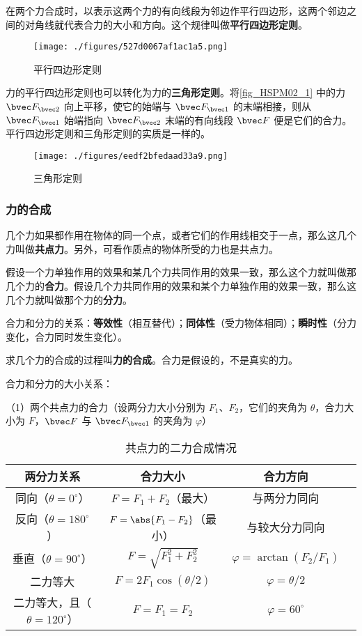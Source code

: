 在两个力合成时，以表示这两个力的有向线段为邻边作平行四边形，这两个邻边之间的对角线就代表合力的大小和方向。这个规律叫做\textbf{平行四边形定则}。
\begin{figure}[ht]
\centering
\texttt{[image: ./figures/527d0067af1ac1a5.png]}
\caption{平行四边形定则} \label{fig_HSPM02_1}
\end{figure}

力的平行四边形定则也可以转化为力的\textbf{三角形定则}。将\autoref{fig_HSPM02_1} 中的力 $\bvec F_{\bvec 2}$ 向上平移，使它的始端与 $\bvec F_{\bvec 1}$ 的末端相接，则从 $\bvec F_{\bvec 1}$ 始端指向 $\bvec F_{\bvec 2}$ 末端的有向线段 $\bvec F$ 便是它们的合力。平行四边形定则和三角形定则的实质是一样的。
\begin{figure}[ht]
\centering
\texttt{[image: ./figures/eedf2bfedaad33a9.png]}
\caption{三角形定则} \label{fig_HSPM02_2}
\end{figure}

\subsubsection{力的合成}
几个力如果都作用在物体的同一个点，或者它们的作用线相交于一点，那么这几个力叫做\textbf{共点力}。另外，可看作质点的物体所受的力也是共点力。

假设一个力单独作用的效果和某几个力共同作用的效果一致，那么这个力就叫做那几个力的\textbf{合力}。假设几个力共同作用的效果和某个力单独作用的效果一致，那么这几个力就叫做那个力的\textbf{分力}。

合力和分力的关系：\textbf{等效性}（相互替代）；\textbf{同体性}（受力物体相同）；\textbf{瞬时性}（分力变化，合力同时发生变化）。

求几个力的合成的过程叫\textbf{力的合成}。合力是假设的，不是真实的力。

合力和分力的大小关系：

（1）两个共点力的合力（设两分力大小分别为 $F_1$、$F_2$，它们的夹角为 $\theta$，合力大小为 $F$，$\bvec F$ 与 $\bvec F_{\bvec 1}$ 的夹角为 $\varphi $）

\begin{table}[ht]
\centering
\caption{共点力的二力合成情况}\label{tab_HSPM02_1}
\begin{tabular}{|c|c|c|c|}
\hline
两分力关系 &  合力大小 & 合力方向 \\
\hline
同向（$\theta=0^{\circ}$） &  $F=F_1+F_2$（最大） & 与两分力同向 \\
\hline
反向（$\theta=180^{\circ}$） &  $F=\abs{F_1-F_2}$（最小） & 与较大分力同向 \\
\hline
垂直（$\theta=90^{\circ}$） &  $F=\sqrt{F_1^2+F_2^2}$ & $\varphi=\arctan{(F_2/F_1)}$ \\
\hline
二力等大 &  $F=2F_1\cos{(\theta/2)}$ & $\varphi=\theta/2$ \\
\hline
二力等大，且（$\theta=120^{\circ}$） &  $F=F_1=F_2$ & $\varphi=60^{\circ}$ \\
\hline
\end{tabular}
\end{table}

